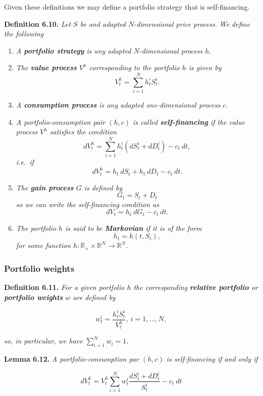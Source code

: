 \documentclass[
]{article}
\providecommand{\tightlist}{%
  \setlength{\itemsep}{0pt}\setlength{\parskip}{0pt}}
\begin{document}
Given these definitions we may define a portfolio strategy that is
self-financing.

\textbf{Definition 6.10.} \emph{Let \(S\) be and adapted
\(N\)-dimensional price process. We define the following}

\begin{enumerate}
\def\labelenumi{\arabic{enumi}.}
\tightlist
\item
  \emph{A \textbf{portfolio strategy} is any adapted \(N\)-dimensional
  process \(h\).}
\item
  \emph{The \textbf{value process} \(V^h\) corresponding to the
  portfolio \(h\) is given by} \[
    V_t^h=\sum_{i=1}^N h_t^iS_t^i.\tag{6.17}
    \]
\item
  \emph{A \textbf{consumption process} is any adapted one-dimensional
  process \(c\).}
\item
  \emph{A portfolio-consumption pair \((h,c)\) is called
  \textbf{self-financing} if the value process \(V^h\) satisfies the
  condition} \[
    dV_t^h=\sum_{i=1}^N h_t^i(dS_t^i+d D^i_t)-c_t\ dt,\tag{6.18}
    \] \emph{i.e.~if} \[
    dV_t^h=h_t\ dS_t + h_t\ dD_t -c_t\ dt.
    \]
\item
  \emph{The \textbf{gain process} \(G\) is defined by} \[
    G_t=S_t+D_t\tag{6.19}
    \] \emph{so we can write the self-financing condition as} \[
    dV_t=h_t\ dG_t-c_t\ dt.\tag{6.20}
    \]
\item
  \emph{The portfolio \(h\) is said to be \textbf{Markovian} if it is of
  the form} \[
    h_t=h(t,S_t),
    \] \emph{for some function
  \(h : \mathbb{R}_+\times \mathbb{R}^N\to\mathbb{R}^N\).}
\end{enumerate}

\hypertarget{portfolio-weights}{%
\subsubsection{Portfolio weights}\label{portfolio-weights}}

\textbf{Definition 6.11.} \emph{For a given portfolio \(h\) the
corresponding \textbf{relative portfolio} or \textbf{portfolio weights}
\(w\) are defined by}

\[
w_t^i=\frac{h_t^iS_t^i}{V_t^h},\ i=1,...,N,\tag{6.21}
\]

\emph{so, in particular, we have \(\sum_{i=1}^N w_i=1\).}

\textbf{Lemma 6.12.} \emph{A portfolio-consumption par \((h,c)\) is
self-financing if and only if}

\[
dV_t^h=V_t^h\sum_{i=1}^N w_t^i\frac{dS_t^i+dD_t^i}{S_t^i}-c_t\ dt\tag{6.22}
\]
\end{document}
